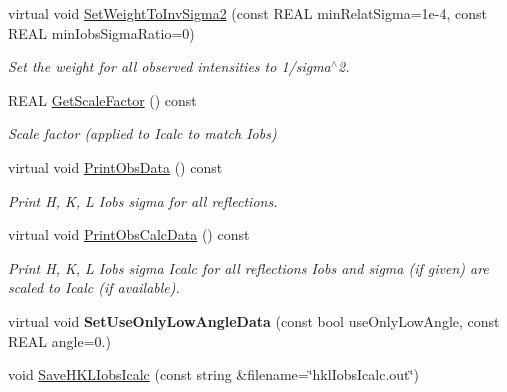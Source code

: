 \begin{DoxyCompactItemize}
virtual void \mbox{\hyperlink{class_obj_cryst_1_1_diffraction_data_single_crystal_a76f0f6b9eab4f00b7fa9afc17e951235}{Set\+Weight\+To\+Inv\+Sigma2}} (const R\+E\+AL min\+Relat\+Sigma=1e-\/4, const R\+E\+A\+L min\+Iobs\+Sigma\+Ratio=0)
\begin{DoxyCompactList}\small\item\em Set the weight for all observed intensities to 1/sigma$^\wedge$2. \end{DoxyCompactList}\item 
\mbox{\label{class_obj_cryst_1_1_diffraction_data_single_crystal_aa8b0b219298771db3e50c05c8d2a3e61}} 
R\+E\+AL \mbox{\hyperlink{class_obj_cryst_1_1_diffraction_data_single_crystal_aa8b0b219298771db3e50c05c8d2a3e61}{Get\+Scale\+Factor}} () const
\begin{DoxyCompactList}\small\item\em Scale factor (applied to Icalc to match Iobs) \end{DoxyCompactList}\item 
virtual void \mbox{\hyperlink{class_obj_cryst_1_1_diffraction_data_single_crystal_abad3dcb258e1779a6c14cdc51b92f8c1}{Print\+Obs\+Data}} () const
\begin{DoxyCompactList}\small\item\em Print H, K, L Iobs sigma for all reflections. \end{DoxyCompactList}\item 
virtual void \mbox{\hyperlink{class_obj_cryst_1_1_diffraction_data_single_crystal_ab11d02b972bd40e6fc024d0e8ed4f1a1}{Print\+Obs\+Calc\+Data}} () const
\begin{DoxyCompactList}\small\item\em Print H, K, L Iobs sigma Icalc for all reflections Iobs and sigma (if given) are scaled to Icalc (if available). \end{DoxyCompactList}\item 
\mbox{\label{class_obj_cryst_1_1_diffraction_data_single_crystal_a8da638cff14677fc130e4e0f71705409}} 
virtual void {\bfseries Set\+Use\+Only\+Low\+Angle\+Data} (const bool use\+Only\+Low\+Angle, const R\+E\+AL angle=0.)
\item 
void \mbox{\hyperlink{class_obj_cryst_1_1_diffraction_data_single_crystal_af220156c564b8d602b0c05ba222fba03}{Save\+H\+K\+L\+Iobs\+Icalc}} (const string \&filename=\char`\"{}hkl\+Iobs\+Icalc.\+out\char`\"{})

\end{DoxyCompactItemize}
